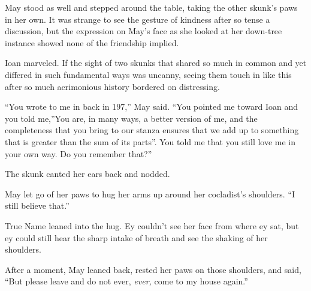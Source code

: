 May stood as well and stepped around the table, taking the other skunk's paws in her own. It was strange to see the gesture of kindness after so tense a discussion, but the expression on May's face as she looked at her down-tree instance showed none of the friendship implied.

Ioan marveled. If the sight of two skunks that shared so much in common and yet differed in such fundamental ways was uncanny, seeing them touch in like this after so much acrimonious history bordered on distressing.

``You wrote to me in back in 197,'' May said. ``You pointed me toward Ioan and you told me,''You are, in many ways, a better version of me, and the completeness that you bring to our stanza ensures that we add up to something that is greater than the sum of its parts''. You told me that you still love me in your own way. Do you remember that?''

The skunk canted her ears back and nodded.

May let go of her paws to hug her arms up around her cocladist's shoulders. ``I still believe that.''

True Name leaned into the hug. Ey couldn't see her face from where ey sat, but ey could still hear the sharp intake of breath and see the shaking of her shoulders.

After a moment, May leaned back, rested her paws on those shoulders, and said, ``But please leave and do not ever, \emph{ever,} come to my house again.''
